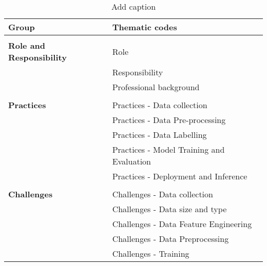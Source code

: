 \begin{table}[htbp]
  \centering
  \caption{Add caption}
    \begin{tabular}{rl}
    \hline
    \multicolumn{1}{l}{Group} & Thematic codes \\
    \hline
     & \\
    \multicolumn{1}{l}{\textbf{Role and Responsibility}} &
      Role \\
      &
      Responsibility
      \\
     &
      Professional background \\
    \hline
     & \\
    \multicolumn{1}{l}{\textbf{Practices}} &
      Practices - Data collection
      \\
     &
      Practices - Data Pre-processing
      \\
     &
      Practices - Data Labelling
      \\
     &
      Practices - Model Training and Evaluation
      \\
     &
      Practices - Deployment and Inference
      \bigstrut\\
    \hline
     &

      \bigstrut\\
    \multicolumn{1}{l}{\textbf{Challenges}} &
      Challenges - Data collection
      \\
     &
      Challenges - Data size and type
      \\
     &
      Challenges - Data Feature Engineering
      \\
     &
      Challenges - Data Preprocessing
      \\
     &
      Challenges - Training \\
    \hline
    \end{tabular}%
  \label{tab:coding}%
\end{table}%
